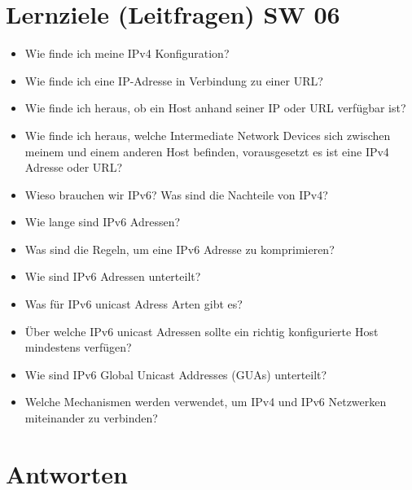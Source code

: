 \section{Lernziele (Leitfragen) SW 06}
\begin{itemize}
    \item Wie finde ich meine IPv4 Konfiguration?
    \item Wie finde ich eine IP-Adresse in Verbindung zu einer URL?
    \item Wie finde ich heraus, ob ein Host anhand seiner IP oder URL verfügbar ist?
    \item Wie finde ich heraus, welche Intermediate Network Devices sich zwischen meinem und einem anderen Host befinden, vorausgesetzt es ist eine IPv4 Adresse oder URL?
    \item Wieso brauchen wir IPv6? Was sind die Nachteile von IPv4?
    \item Wie lange sind IPv6 Adressen?
    \item Was sind die Regeln, um eine IPv6 Adresse zu komprimieren?
    \item Wie sind IPv6 Adressen unterteilt?
    \item Was für IPv6 unicast Adress Arten gibt es?
    \item Über welche IPv6 unicast Adressen sollte ein richtig konfigurierte Host mindestens verfügen?
    \item Wie sind IPv6 Global Unicast Addresses (GUAs) unterteilt?
    \item Welche Mechanismen werden verwendet, um IPv4 und IPv6 Netzwerken miteinander zu verbinden?
\end{itemize}

\section{Antworten}
